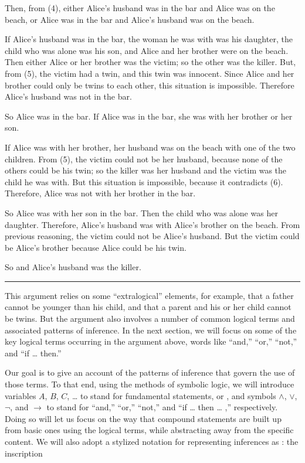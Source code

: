 \documentclass[letterpaper,10pt,english]{sphinxmanual}
\begin{document}
\sphinxAtStartPar
Then, from (4), either Alice’s husband was in the bar and Alice was on the beach, or Alice was in the bar and Alice’s husband was on the beach.

\sphinxAtStartPar
If Alice’s husband was in the bar, the woman he was with was his daughter, the child who was alone was his son, and Alice and her brother were on the beach. Then either Alice or her brother was the victim; so the other was the killer. But, from (5), the victim had a twin, and this twin was innocent. Since Alice and her brother could only be twins to each other, this situation is impossible. Therefore Alice’s husband was not in the bar.

\sphinxAtStartPar
So Alice was in the bar. If Alice was in the bar, she was with her brother or her son.

\sphinxAtStartPar
If Alice was with her brother, her husband was on the beach with one of the two children. From (5), the victim could not be her husband, because none of the others could be his twin; so the killer was her husband and the victim was the child he was with. But this situation is impossible, because it contradicts (6). Therefore, Alice was not with her brother in the bar.

\sphinxAtStartPar
So Alice was with her son in the bar. Then the child who was alone was her daughter. Therefore, Alice’s husband was with Alice’s brother on the beach. From previous reasoning, the victim could not be Alice’s husband. But the victim could be Alice’s brother because Alice could be his twin.

\sphinxAtStartPar
So  and Alice’s husband was the killer.


\bigskip\hrule\bigskip


\sphinxAtStartPar
This argument relies on some “extralogical” elements, for example, that a father cannot be younger than his child, and that a parent and his or her child cannot be twins. But the argument also involves a number of common logical terms and associated patterns of inference. In the next section, we will focus on some of the key logical terms occurring in the argument above, words like “and,” “or,” “not,” and “if … then.”

\sphinxAtStartPar
Our goal is to give an account of the patterns of inference that govern the use of those terms. To that end, using the methods of symbolic logic, we will introduce variables \(A\), \(B\), \(C\), … to stand for fundamental statements, or , and symbols \(\wedge\), \(\vee\), \(\neg\), and \(\to\) to stand for “and,” “or,” “not,” and “if … then … ,” respectively. Doing so will let us focus on the way that compound statements are built up from basic ones using the logical terms, while abstracting away from the specific content. We will also adopt a stylized notation for representing inferences as : the inscription
\end{document}
